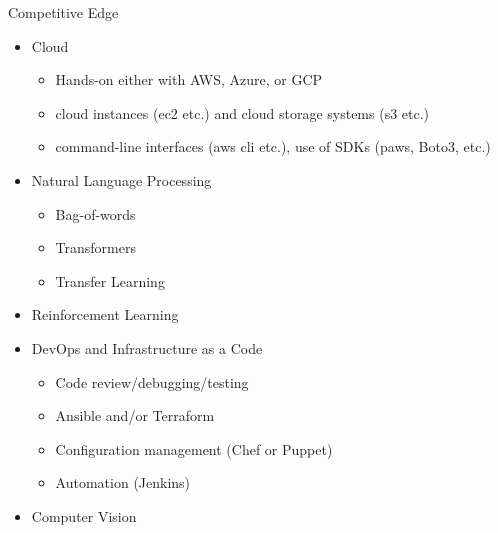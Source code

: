 \documentclass[compress,brown]{beamer}
\begin{document}
\begin{frame} {Competitive Edge}
	\begin{itemize}
		\item Cloud
			\begin{itemize}
				\item Hands-on either with AWS, Azure, or GCP
				\item cloud instances (ec2 etc.) and cloud storage systems (s3 etc.)
				\item command-line interfaces (aws cli etc.), use of SDKs (paws, Boto3, etc.)
			\end{itemize}		
		\item Natural Language Processing
			\begin{itemize}
				\item Bag-of-words
				\item Transformers
				\item Transfer Learning
			\end{itemize}		
		\item Reinforcement Learning
		\item DevOps and Infrastructure as a Code
		\begin{itemize}
			\item Code review/debugging/testing
			\item Ansible and/or Terraform 
			\item Configuration management (Chef or Puppet)
			\item Automation (Jenkins)
		\end{itemize}
		\item Computer Vision
	\end{itemize}
\end{frame}
\end{document}
